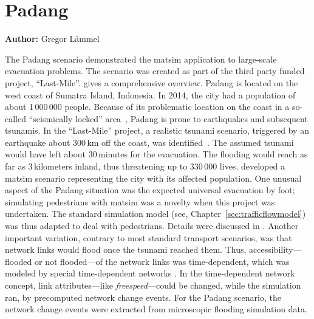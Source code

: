 \section{Padang}
\label{sec:padang}
\hfill \textbf{Author:} Gregor Lämmel


The Padang scenario demonstrated the \gls{matsim} application to large-scale evacuation problems. The scenario was created as part of the third party funded project, ``Last-Mile''. \citet{00TaubenboeckEtAl2012ConcludingLastMilePaperNatHazards} gives a comprehensive overview.
Padang is located on the west coast of Sumatra Island, Indonesia. In 2014, the city had a population of about 1\,000\,000 people. 
Because of its problematic location on the coast in a so-called ``seismically locked'' area~\citep{McCloskey2010Padang2009Earthquake}, Padang is prone to earthquakes and subsequent tsunamis. In the ``Last-Mile'' project, a realistic tsunami scenario, triggered by an earthquake about 300\,km off the coast, was identified~\citep{GosebergSchlurmann2009HazardMappingPadang}. The assumed tsunami would have left about 30\,minutes for the evacuation. The flooding would reach as far as 3\,kilometers inland, thus threatening up to 330\,000 lives. \citet{Laemmel_PhDThesis_2011} developed a \gls{matsim} scenario representing the city with its affected population. One unusual aspect of the Padang situation was the expected universal evacuation by foot; simulating pedestrians with \gls{matsim} was a novelty when this project was undertaken. The standard simulation model (see, \eg Chapter~\ref{sec:trafficflowmodel}) was thus adapted to deal with pedestrians. 
Details were discussed in \citet{00LaemmelKluepfelNagel2009EvacPadangAtBookTimmermanns}. Another important variation, contrary to most standard transport scenarios, was that network links would flood once the tsunami reached them. Thus, accessibility---flooded or not flooded---of the network links was time-dependent, which was modeled by special time-dependent networks \citep{00LaemmelGretherNagel2009TimeDependentNetworks}. In the time-dependent network concept, link attributes---like \emph{freespeed}---could be changed, while the simulation ran, by precomputed network change events. For the Padang scenario, the network change events were extracted from microscopic flooding simulation data.

